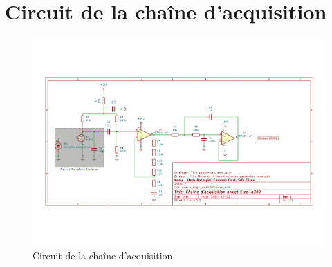 \section{Circuit de la chaîne d'acquisition}\label{chaineacquiannexe}
\begin{figure}[H]
    \centering
    \includegraphics[width=1.4\textwidth,angle=90,origin=c]{pdffiles/chainacquiFullColor.pdf}
    \caption{Circuit de la chaîne d'acquisition}
    \label{fig:chainacquiannexe}
\end{figure}


%
%
%

